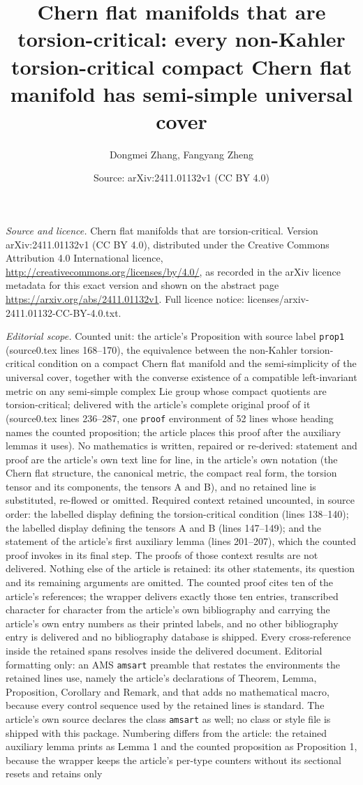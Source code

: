 \documentclass[10pt,a4paper]{amsart}
\title[Chern flat manifolds that are torsion-critical]{Chern flat manifolds that are torsion-critical: every non-Kahler torsion-critical compact Chern flat manifold has semi-simple universal cover}
\author{Dongmei Zhang, Fangyang Zheng}
\date{Source: arXiv:2411.01132v1 (CC BY 4.0)}
\theoremstyle{plain}
\theoremstyle{remark}
\begin{document}
\maketitle
\noindent\emph{Source and licence.} Chern flat manifolds that are torsion-critical. Version arXiv:2411.01132v1 (CC BY 4.0), distributed under the Creative Commons Attribution 4.0 International licence, \url{http://creativecommons.org/licenses/by/4.0/}, as recorded in the arXiv licence metadata for this exact version and shown on the abstract page \url{https://arxiv.org/abs/2411.01132v1}. Full licence notice: licenses/arxiv-2411.01132-CC-BY-4.0.txt.\par\smallskip

\noindent\textit{Editorial scope.} Counted unit: the article's Proposition with source label \texttt{prop1} (source0.tex lines 168--170), the equivalence between the non-Kahler torsion-critical condition on a compact Chern flat manifold and the semi-simplicity of the universal cover, together with the converse existence of a compatible left-invariant metric on any semi-simple complex Lie group whose compact quotients are torsion-critical; delivered with the article's complete original proof of it (source0.tex lines 236--287, one \texttt{proof} environment of 52 lines whose heading names the counted proposition; the article places this proof after the auxiliary lemmas it uses). No mathematics is written, repaired or re-derived: statement and proof are the article's own text line for line, in the article's own notation (the Chern flat structure, the canonical metric, the compact real form, the torsion tensor and its components, the tensors A and B), and no retained line is substituted, re-flowed or omitted. Required context retained uncounted, in source order: the labelled display defining the torsion-critical condition (lines 138--140); the labelled display defining the tensors A and B (lines 147--149); and the statement of the article's first auxiliary lemma (lines 201--207), which the counted proof invokes in its final step. The proofs of those context results are not delivered. Nothing else of the article is retained: its other statements, its question and its remaining arguments are omitted. The counted proof cites ten of the article's references; the wrapper delivers exactly those ten entries, transcribed character for character from the article's own bibliography and carrying the article's own entry numbers as their printed labels, and no other bibliography entry is delivered and no bibliography database is shipped. Every cross-reference inside the retained spans resolves inside the delivered document. Editorial formatting only: an AMS \texttt{amsart} preamble that restates the environments the retained lines use, namely the article's declarations of Theorem, Lemma, Proposition, Corollary and Remark, and that adds no mathematical macro, because every control sequence used by the retained lines is standard. The article's own source declares the class \texttt{amsart} as well; no class or style file is shipped with this package. Numbering differs from the article: the retained auxiliary lemma prints as Lemma 1 and the counted proposition as Proposition 1, because the wrapper keeps the article's per-type counters without its sectional resets and retains only 
\end{document}

